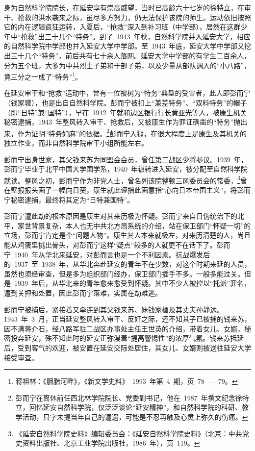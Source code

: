 身为自然科学院院长，在延安享有崇高威望，当时已高龄六十七岁的徐特立，在审干、抢救的洪水袭来之际，虽尽多方努力，仍无法保护该院的师生。运动依旧按照它的内在逻辑疯狂运转，入夏后，“抢救”深入到补习班（中学部），居然在这群少年中“抢救”出三十几个“特务”。到了~1943~年秋，自然科学院并入延安大学，相应的自然科学院中学部也并入延安大学中学部。至~1943~年底，延安大学中学部又挖出三十几个“特务”，前后共有七十余人落网。延安大学中学部的有学生二百余人，分为五个班，大多为中共烈士子弟和干部子弟，以及少量从部队调入的“小八路”，竟三分之一成了“特务”\footnote{蒋祖林：《胭脂河畔》，《新文学史料》~1993~年第~4~期，页~78~—~79。}。

在延安审干和“抢救”运动中，曾有一位被树为“特务”典型的受害者，此人即彭而宁（钱家骥），也是出自自然科学院。彭而宁被扣上“兼差特务”、“双料特务”的帽子（即“日特”兼“国特”），早在~1942~年就和边区银行行长黄亚光等人，被康生机关秘密逮捕，1943~年整风转入审干、抢救后，又被康生作为罪证确凿的“特务”抛出来，作为证明“特务如麻”的依据。\footnote{彭而宁在离休前任西北林学院院长、党委副书记，他在~1987~年撰文纪念徐特立，回忆延安自然科学院，仅泛泛谈论“延安精神”，和自然科学院的科研、教学活动，只字未提当年自己的遭遇，可能是不忍再触及心灵上弥久的伤痛。}彭而宁入狱，在很大程度上是康生及其机关的独立作业，而非自然科学院审干小组所能左右。

彭而宁出身世家，其父钱来苏为同盟会会员，曾任第二战区少将参议。1939~年，彭而宁毕业于北平中国大学国学系，1940~年辗转进入延安，被分配至自然科学院就读。整风之初，彭而宁作为非党人士，曾名列该院整顿三风委员会的常委，\footnote{《延安自然科学院史料》编辑委员会：《延安自然科学院史料》（北京：中共党史资料出版社、北京工业学院出版社，1986~年），页~119。}曾在壁报报头画了一幅向日葵，康生就此诬指此画意指“心向日本帝国主义”，将彭而宁秘密逮捕，最终将其定为“日特兼国特”。

彭而宁遭此劫的根本原因是康生对其来历极为怀疑。彭而宁来自日伪统治下的北平，家世背景复杂，本人也无中共北方局系统的介绍，站在保卫部门“怀疑一切”的立场，彭而宁肯定是个“问题人物”。康生其人本来就极左，对来历清楚的人，尚且能从鸡蛋里挑出骨头，对彭而宁这样“疑点”较多的人就更不在话下了。彭而宁~1940~年从华北来延安，对彭而言也是一个不利因素。抗战爆发后的~1937~至~1938~年，从华北奔赴延安的青年不在少数，对这个时期来延的人员，虽然也须经审查，但是多为组织部门经办，保卫部门插手不多。一般多能过关。但是~1939~年后，从华北来的青年愈来愈受到怀疑。其中不少人被控以“托派”罪名，遭到关押和处置，因此彭而宁落难，实属在劫难逃。

彭而宁被捕后，紧接着又牵连到其父钱来苏、妹钱家楣及其丈夫孙静远。1943~年~3~月，正当延安整风转入审干、反奸之际，还不知其子已被捕的钱来苏，因不满蒋介石，经八路军驻二战区办事处主任王世英的介绍，带着女儿、女婿，秘密投奔延安，殊不知此时的延安正弥漫着“提高警惕性”的浓厚气氛。钱来苏抵延后，受到客气的欢迎，被安置在延安交际处居住，其女儿、女婿则被送往延安大学接受审查。

